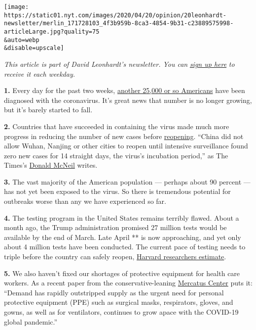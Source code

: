 \texttt{[image: https://static01.nyt.com/images/2020/04/20/opinion/20leonhardt-newsletter/merlin\_171728103\_4f3b959b-8ca3-4854-9b31-c23889575998-articleLarge.jpg?quality=75\\\&auto=webp\\\&disable=upscale]}

\emph{This article is part of David Leonhardt's newsletter. You can}
\href{https://www.nytimes.com/newsletters/opiniontoday?action=click\&module=Intentional\&pgtype=Article}{\emph{sign
up here}} \emph{to receive it each weekday.}

\textbf{1.} Every day for the past two weeks,
\href{https://www.nytimes.com/interactive/2020/us/coronavirus-us-cases.html}{another
25,000 or so Americans} have been diagnosed with the coronavirus. It's
great news that number is no longer growing, but it's barely started to
fall.

\textbf{2.} Countries that have succeeded in containing the virus made
much more progress in reducing the number of new cases before
\href{https://www.nytimes.com/2020/04/24/us/coronavirus-midwest-mayors-reopening.html}{reopening}.
``China did not allow Wuhan, Nanjing or other cities to reopen until
intensive surveillance found zero new cases for 14 straight days, the
virus's incubation period,'' as The Times's
\href{https://www.nytimes.com/2020/04/18/health/coronavirus-america-future.html}{Donald
McNeil} writes.

\textbf{3.} The vast majority of the American population --- perhaps
about 90 percent --- has not yet been exposed to the virus. So there is
tremendous potential for outbreaks worse than any we have experienced so
far.

\textbf{4.} The testing program in the United States remains terribly
flawed. About a month ago, the Trump administration promised 27 million
tests would be available by the end of March. Late April ** is now
approaching, and yet only about 4 million tests have been conducted. The
current pace of testing needs to triple before the country can safely
reopen,
\href{https://www.nytimes.com/interactive/2020/04/17/us/coronavirus-testing-states.html?referringSource=articleShare}{Harvard
researchers estimate}.

\textbf{5.} We also haven't fixed our shortages of protective equipment
for health care workers. As a recent paper from the conservative-leaning
\href{https://www.mercatus.org/publications/covid-19-policy-brief-series/masks-all-using-purchase-guarantees-and-targeted}{Mercatus
Center} puts it: ``Demand has rapidly outstripped supply as the urgent
need for personal protective equipment (PPE) such as surgical masks,
respirators, gloves, and gowns, as well as for ventilators, continues to
grow apace with the COVID-19 global pandemic.''

